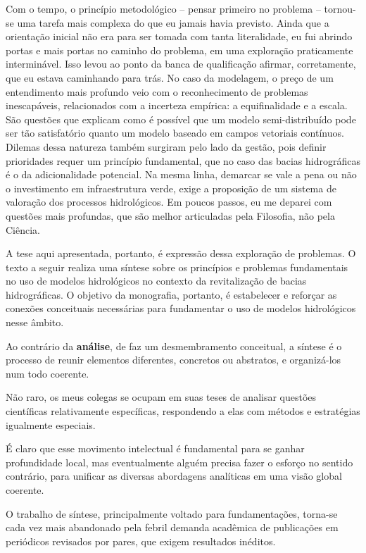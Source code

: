 \documentclass[./main.tex]{subfiles}
\begin{document}
\par Com o tempo, o princípio metodológico -- pensar primeiro no problema -- tornou-se uma tarefa mais complexa do que eu jamais havia previsto. Ainda que a orientação inicial não era para ser tomada com tanta literalidade, eu fui abrindo portas e mais portas no caminho do problema, em uma exploração praticamente interminável. Isso levou ao ponto da banca de qualificação afirmar, corretamente, que eu estava caminhando para trás. No caso da modelagem, o preço de um entendimento mais profundo veio com o reconhecimento de problemas inescapáveis, relacionados com a incerteza empírica: a equifinalidade e a escala. São questões que explicam como é possível que um modelo semi-distribuído pode ser tão satisfatório quanto um modelo baseado em campos vetoriais contínuos. Dilemas dessa natureza também surgiram pelo lado da gestão, pois definir prioridades requer um princípio fundamental, que no caso das bacias hidrográficas é o da adicionalidade potencial. Na mesma linha, demarcar se vale a pena ou não o investimento em infraestrutura verde, exige a proposição de um sistema de valoração dos processos hidrológicos. Em poucos passos, eu me deparei com questões mais profundas, que são melhor articuladas pela Filosofia, não pela Ciência. 

\par A tese aqui apresentada, portanto, é expressão dessa exploração de problemas. O texto a seguir realiza uma síntese sobre os princípios e problemas fundamentais no uso de modelos hidrológicos no contexto da revitalização de bacias hidrográficas. O objetivo da monografia, portanto, é estabelecer e reforçar as conexões conceituais necessárias para fundamentar o uso de modelos hidrológicos nesse âmbito. 

Ao contrário da \textbf{análise}, de faz um desmembramento conceitual, a síntese é o processo de reunir elementos diferentes, concretos ou abstratos, e organizá-los num todo coerente.  

Não raro, os meus colegas se ocupam em suas teses de analisar questões científicas relativamente específicas, respondendo a elas com métodos e estratégias igualmente especiais. 

É claro que esse movimento intelectual é fundamental para se ganhar profundidade local, mas eventualmente alguém precisa fazer o esforço no sentido contrário, para unificar as diversas abordagens analíticas em uma visão global coerente.

O trabalho de síntese, principalmente voltado para fundamentações, torna-se cada vez mais abandonado pela febril demanda acadêmica de publicações em periódicos revisados por pares, que exigem resultados inéditos. 
\end{document}
